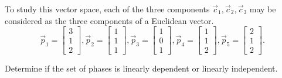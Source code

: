 \begin{activity}{5}
To study this vector space, each of the three components \(\vec c_1,\vec c_2,\vec c_3\) may be considered
as the three components of a Euclidean vector.
\[ \vec{p}_1 = \begin{bmatrix} 3 \\ 1 \\ 2 \end{bmatrix},
\vec{p}_2 = \begin{bmatrix} 1 \\ 1 \\ 1 \end{bmatrix},
\vec{p}_3 = \begin{bmatrix} 1 \\ 0 \\ 1 \end{bmatrix},
\vec{p}_4 = \begin{bmatrix} 1 \\ 1 \\ 2 \end{bmatrix},
\vec{p}_5 = \begin{bmatrix} 2 \\ 1 \\ 2 \end{bmatrix}.\]

Determine if the set of phases is linearly dependent or linearly independent.
\end{activity}

